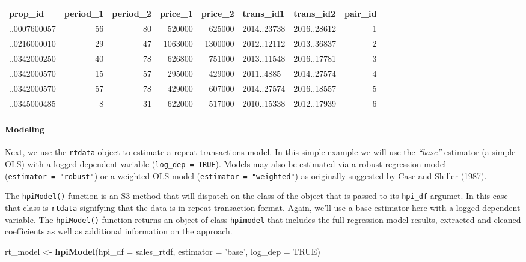 \documentclass[]{article}
\newenvironment{Shaded}{\begin{snugshade}}{\end{snugshade}}
\newcommand{\DataTypeTok}[1]{\textcolor[rgb]{0.13,0.29,0.53}{#1}}
\newcommand{\KeywordTok}[1]{\textcolor[rgb]{0.13,0.29,0.53}{\textbf{#1}}}
\newcommand{\NormalTok}[1]{#1}
\newcommand{\OtherTok}[1]{\textcolor[rgb]{0.56,0.35,0.01}{#1}}
\newcommand{\StringTok}[1]{\textcolor[rgb]{0.31,0.60,0.02}{#1}}
\let\oldparagraph\paragraph
\renewcommand{\paragraph}[1]{\oldparagraph{#1}\mbox{}}
\begin{document}
\begin{longtable}[]{@{}lrrrrllr@{}}
\toprule
prop\_id & period\_1 & period\_2 & price\_1 & price\_2 & trans\_id1 &
trans\_id2 & pair\_id\tabularnewline
\midrule
\endhead
..0007600057 & 56 & 80 & 520000 & 625000 & 2014..23738 & 2016..28612 &
1\tabularnewline
..0216000010 & 29 & 47 & 1063000 & 1300000 & 2012..12112 & 2013..36837 &
2\tabularnewline
..0342000250 & 40 & 78 & 626800 & 751000 & 2013..11548 & 2016..17781 &
3\tabularnewline
..0342000570 & 15 & 57 & 295000 & 429000 & 2011..4885 & 2014..27574 &
4\tabularnewline
..0342000570 & 57 & 78 & 429000 & 607000 & 2014..27574 & 2016..18557 &
5\tabularnewline
..0345000485 & 8 & 31 & 622000 & 517000 & 2010..15338 & 2012..17939 &
6\tabularnewline
\bottomrule
\end{longtable}

\hypertarget{modeling}{%
\paragraph{Modeling}\label{modeling}}

Next, we use the \texttt{rtdata} object to estimate a repeat
transactions model. In this simple example we will use the
\emph{``base''} estimator (a simple OLS) with a logged dependent
variable (\texttt{log\_dep\ =\ TRUE}). Models may also be estimated via
a robust regression model (\texttt{estimator\ =\ "robust"}) or a
weighted OLS model (\texttt{estimator\ =\ "weighted"}) as originally
suggested by Case and Shiller (1987).

The \texttt{hpiModel()} function is an S3 method that will dispatch on
the class of the object that is passed to its \texttt{hpi\_df} argumet.
In this case that class is \texttt{rtdata} signifying that the data is
in repeat-transaction format. Again, we'll use a base estimator here
with a logged dependent variable. The \texttt{hpiModel()} function
returns an object of class \texttt{hpimodel} that includes the full
regression model results, extracted and cleaned coefficients as well as
additional information on the approach.

\begin{Shaded}
\begin{Highlighting}[]
\NormalTok{  rt_model <-}\StringTok{ }\KeywordTok{hpiModel}\NormalTok{(}\DataTypeTok{hpi_df =}\NormalTok{ sales_rtdf,}
                       \DataTypeTok{estimator =} \StringTok{'base'}\NormalTok{,}
                       \DataTypeTok{log_dep =} \OtherTok{TRUE}\NormalTok{)}
\end{Highlighting}
\end{Shaded}
\end{document}
